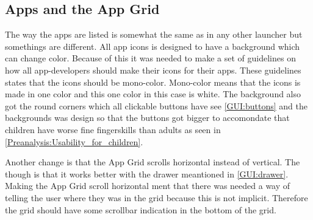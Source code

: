 \subsection{Apps and the App Grid}
\label{GUI:app}

The way the apps are listed is somewhat the same as in any other launcher but somethings are different. All app icons is designed to have a background which can change color. Because of this it was needed to make a set of guidelines on how all app-developers should make their icons for their apps. These guidelines states that the icons should be mono-color. Mono-color means that the icons is made in one color and this one color in this case is white.
The background also got the round corners which all clickable buttons have see \autoref{GUI:buttons} and the backgrounds was design so that the buttons got bigger to accomondate that children have worse fine fingerskills than adults as seen in \autoref{Preanalysis:Usability_for_children}.

Another change is that the App Grid scrolls horizontal instead of vertical. The though is that it works better with the drawer meantioned in \autoref{GUI:drawer}. Making the App Grid scroll horizontal ment that there was needed a way of telling the user where they was in the grid because this is not implicit. Therefore the grid should have some scrollbar indication in the bottom of the grid.